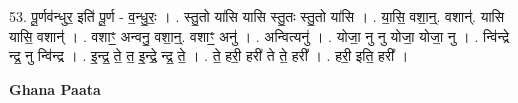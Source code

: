 \documentclass[17pt]{extarticle}
\begin{document}
53. पू॒र्णव॑न्धुर॒ इति॑ पू॒र्ण - व॒न्धु॒रः॒ । . स्तु॒तो या॑सि यासि स्तु॒तः स्तु॒तो या॑सि । . या॒सि॒ वशा॒न्॒. वशान्॑. यासि यासि॒ वशान्॑ । . वशाꣳ॒॒ अन्वनु॒ वशा॒न्॒. वशाꣳ॒॒ अनु॑ । . अन्वित्यनु॑ । . योजा॒ नु नु योजा॒ योजा॒ नु । . न्वि॑न्द्रे न्द्र॒ नु न्वि॑न्द्र । . इ॒न्द्र॒ ते॒ त॒ इ॒न्द्रे॒ न्द्र॒ ते॒ । . ते॒ हरी॒ हरी॑ ते ते॒ हरी᳚ । . हरी॒ इति॒ हरी᳚ । \newline

\textbf{Ghana Paata } \newline
\end{document}
